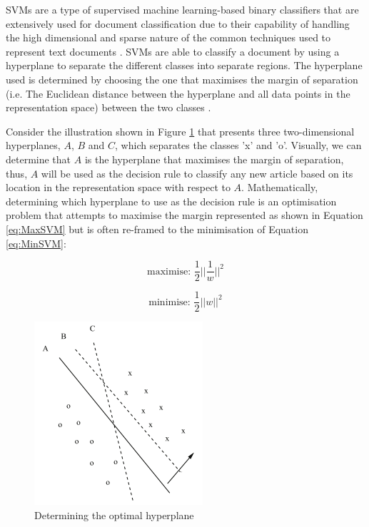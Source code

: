 \documentclass[a4paper,twoside,phd]{BYUPhys}
\begin{document}
SVMs are a type of supervised machine learning-based binary classifiers that are extensively used for document classification due to their capability of handling the high dimensional and sparse nature of the common techniques used to represent text documents \cite{Informatik1997}. SVMs are able to classify a document by using a hyperplane to separate the different classes into separate regions. The hyperplane used is determined by choosing the one that maximises the margin of separation (i.e. The Euclidean distance between the hyperplane and all data points in the representation space) between the two classes \cite{Aggarwal2012}.

Consider the illustration shown in Figure \ref{fig:SVMExample} that presents three  two-dimensional hyperplanes, $A$, $B$ and $C$, which separates the classes 'x' and 'o'. Visually, we can determine that $A$ is the hyperplane that maximises the margin of separation, thus, $A$ will be used as the decision rule to classify any new article based on its location in the representation space with respect to $A$. Mathematically, determining which hyperplane to use as the decision rule is an optimisation problem that attempts to maximise the margin represented as shown in Equation \ref{eq:MaxSVM} but is often re-framed to the minimisation of Equation \ref{eq:MinSVM}:

\begin{equation}
\text{maximise: } \frac{1}{2}||\frac{1}{w}||^2
\label{eq:MaxSVM}
\end{equation}

\begin{equation}
\text{minimise: } \frac{1}{2}||w||^2
\label{eq:MinSVM}
\end{equation}


\begin{figure}[H]
	\centering
	\includegraphics[totalheight=7cm]{images/svm-example.png}
	\caption{Determining the optimal hyperplane \cite{Aggarwal2012}}
	\label{fig:SVMExample}
\end{figure}
\end{document}
